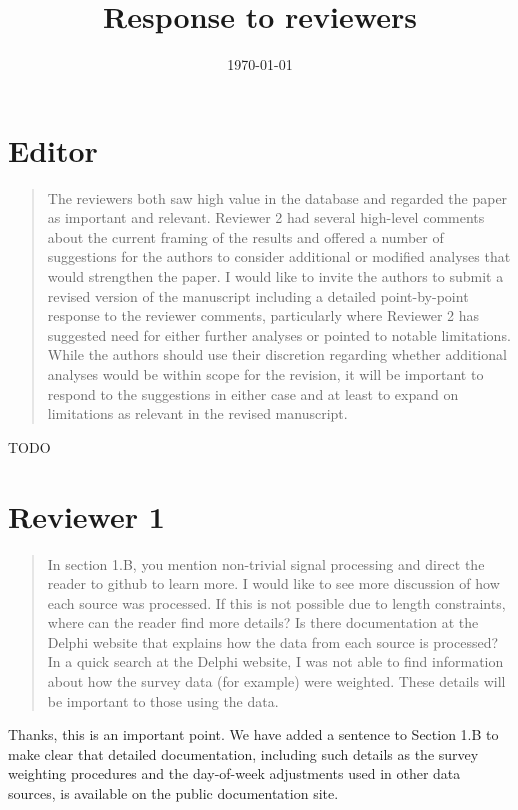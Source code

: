 \documentclass[11pt]{article}
\title{Response to reviewers}
\author{}
\date{\today}
\begin{document}
\maketitle

\section*{Editor}

\begin{quote}
  The reviewers both saw high value in the database and regarded the paper as
  important and relevant. Reviewer 2 had several high-level comments about the
  current framing of the results and offered a number of suggestions for the
  authors to consider additional or modified analyses that would strengthen the
  paper. I would like to invite the authors to submit a revised version of the
  manuscript including a detailed point-by-point response to the reviewer
  comments, particularly where Reviewer 2 has suggested need for either further
  analyses or pointed to notable limitations. While the authors should use their
  discretion regarding whether additional analyses would be within scope for the
  revision, it will be important to respond to the suggestions in either case
  and at least to expand on limitations as relevant in the revised manuscript.
\end{quote}
TODO

\section*{Reviewer 1}

\begin{quote}
  In section 1.B, you mention non-trivial signal processing and direct the
  reader to github to learn more. I would like to see more discussion of how
  each source was processed. If this is not possible due to length constraints,
  where can the reader find more details? Is there documentation at the Delphi
  website that explains how the data from each source is processed? In a quick
  search at the Delphi website, I was not able to find information about how the
  survey data (for example) were weighted. These details will be important to
  those using the data.
\end{quote}
Thanks, this is an important point. We have added a sentence to Section 1.B to
make clear that detailed documentation, including such details as the survey
weighting procedures and the day-of-week adjustments used in other data sources,
is available on the public documentation site.
\end{document}
